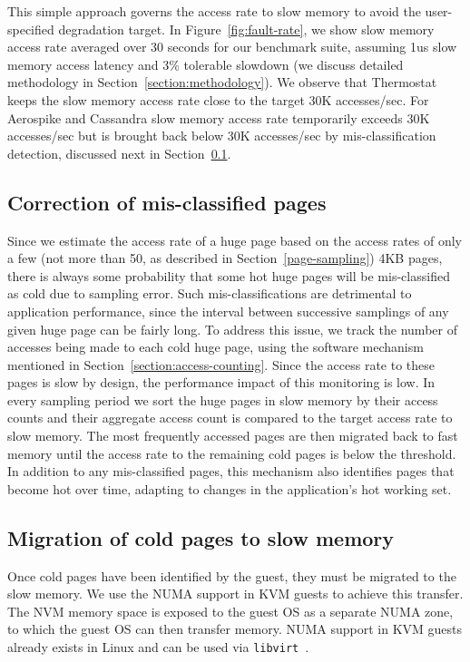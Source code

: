This simple approach governs the access rate to slow memory to avoid the
user-specified degradation target. In Figure~\ref{fig:fault-rate}, we
show slow memory access rate averaged over 30 seconds for our benchmark suite,
assuming 1us slow memory access latency and 3\% tolerable slowdown (we discuss
detailed methodology in Section~\ref{section:methodology}). We observe that
Thermostat keeps the slow memory access rate close to the target 30K
accesses/sec. For Aerospike and Cassandra slow memory access rate
temporarily exceeds 30K accesses/sec but is brought back below 30K accesses/sec by 
mis-classification detection, discussed next in
Section~\ref{classification-correction}.

\subsection{Correction of mis-classified pages}
\label{classification-correction}
Since we estimate the access rate of a huge page based on the access rates
of only a few (not more than 50, as described in
Section~\ref{page-sampling}) 4KB pages, there is always some probability
that some hot huge pages will be mis-classified as cold due to sampling error. 
Such mis-classifications are detrimental to application
performance, since the interval between successive samplings of any given
huge page can be fairly long. To address this issue, we track the number of
accesses being made to each cold huge page, using the software
mechanism mentioned in Section~\ref{section:access-counting}.  Since the access
rate to these pages is slow by design, the performance impact of this monitoring is low.
In every sampling period we sort the huge pages in slow memory by their access
counts and their aggregate access count is compared to the target access rate to slow
memory. The most frequently accessed pages are then migrated back to fast memory 
until the  access rate to the remaining cold pages is below the threshold.
In addition to any mis-classified pages, this mechanism also identifies pages that become hot over time, adapting
to changes in the application's hot working set.


\subsection{Migration of cold pages to slow memory}
Once cold pages have been identified by the guest, they must be migrated to 
the slow memory. We use the NUMA support in KVM guests to achieve this transfer. The NVM
memory space is exposed to the guest OS as a separate NUMA zone, to which the guest
OS can then transfer memory. NUMA support in KVM guests already exists in Linux
and can be used via {\tt libvirt}~\cite{libvirt-numa}.

